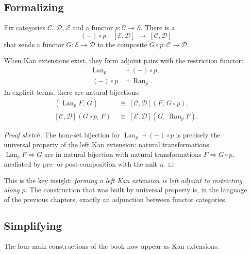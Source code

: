 \subsection{Formalizing}

Fix categories $\mathcal{C}$, $\mathcal{D}$, $\mathcal{E}$ and a functor
$p : \mathcal{C} \to \mathcal{E}$. There is a 
\[
  (-) \circ p \;:\; [\mathcal{E}, \mathcal{D}] \;\longrightarrow\; [\mathcal{C}, \mathcal{D}]
\]
that sends a functor $G : \mathcal{E} \to \mathcal{D}$ to the composite
$G \circ p : \mathcal{C} \to \mathcal{D}$.

\begin{theorem}
When Kan extensions exist, they form adjoint pairs with the restriction functor:
\begin{align*}
  \operatorname{Lan}_p &\dashv (-) \circ p, \\
  (-) \circ p &\dashv \operatorname{Ran}_p.
\end{align*}
In explicit terms, there are natural bijections:
\begin{align*}
  [\mathcal{E}, \mathcal{D}](\operatorname{Lan}_p F,\, G)
    &\;\cong\; [\mathcal{C}, \mathcal{D}](F,\, G \circ p), \\
  [\mathcal{C}, \mathcal{D}](G \circ p,\, F)
    &\;\cong\; [\mathcal{E}, \mathcal{D}](G,\, \operatorname{Ran}_p F).
\end{align*}
\end{theorem}

\begin{proof}[Proof sketch]
The hom-set bijection for $\operatorname{Lan}_p \dashv (-) \circ p$ is precisely
the universal property of the left Kan extension: natural transformations
$\operatorname{Lan}_p F \Rightarrow G$ are in natural bijection with natural
transformations $F \Rightarrow G \circ p$, mediated by pre- or post-composition
with the unit $\eta$.
\end{proof}

This is the key insight: \emph{forming a left Kan extension is left adjoint to
restricting along $p$}. The construction that was built by universal property
is, in the language of the previous chapters, exactly an adjunction between
functor categories.

\subsection{Simplifying}

The four main constructions of the book now appear as Kan extensions:

